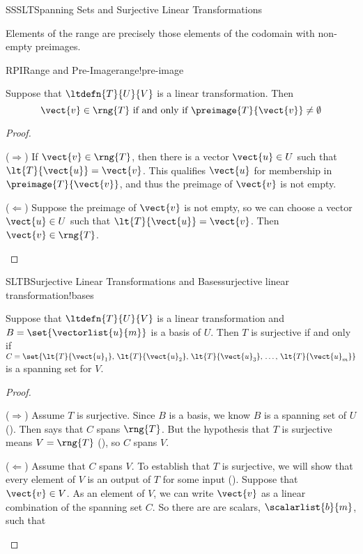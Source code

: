 \begin{subsect}{SSSLT}{Spanning Sets and Surjective Linear Transformations}
%
\begin{para}Elements of the range are precisely those elements of the codomain with non-empty preimages.\end{para}
%
\begin{theorem}{RPI}{Range and Pre-Image}{range!pre-image}
\begin{para}Suppose that $\ltdefn{T}{U}{V}$ is a linear transformation.  Then
%
\begin{equation*}
\vect{v}\in\rng{T}\text{ if and only if }\preimage{T}{\vect{v}}\neq\emptyset
\end{equation*}
\end{para}
%
\end{theorem}
%
\begin{proof}
\begin{para}($\Rightarrow$)  If $\vect{v}\in\rng{T}$, then there is a vector $\vect{u}\in U$ such that $\lt{T}{\vect{u}}=\vect{v}$.  This qualifies $\vect{u}$ for membership in $\preimage{T}{\vect{v}}$, and thus the preimage of $\vect{v}$ is not empty.\end{para}
%
\begin{para}($\Leftarrow$)  Suppose the preimage of $\vect{v}$ is not empty, so we can choose a vector $\vect{u}\in U$ such that $\lt{T}{\vect{u}}=\vect{v}$.  Then $\vect{v}\in\rng{T}$.\end{para}
%
\end{proof}
%
\begin{theorem}{SLTB}{Surjective Linear Transformations and Bases}{surjective linear transformation!bases}
\begin{para}Suppose that $\ltdefn{T}{U}{V}$ is a linear transformation and $B=\set{\vectorlist{u}{m}}$ is a basis of $U$.  Then $T$ is surjective if and only if $C=\set{\lt{T}{\vect{u}_1},\,\lt{T}{\vect{u}_2},\,\lt{T}{\vect{u}_3},\,\ldots,\,\lt{T}{\vect{u}_m}}$ is a spanning set for $V$.\end{para}
\end{theorem}
%
\begin{proof}
%
\begin{para}($\Rightarrow$)  Assume $T$ is surjective.  Since $B$ is a basis, we know $B$ is a spanning set of $U$ ().  Then  says that $C$ spans $\rng{T}$.  But the hypothesis that $T$ is surjective means $V=\rng{T}$ (), so $C$ spans $V$.\end{para}
%
\begin{para}($\Leftarrow$)  Assume that $C$ spans $V$.  To establish that $T$ is surjective, we will show that every element of $V$ is an output of $T$ for some input ().  Suppose that $\vect{v}\in V$.  As an element of $V$, we can write $\vect{v}$ as a linear combination of the spanning set $C$.  So there are are scalars, $\scalarlist{b}{m}$, such that

\end{para}
\end{proof}
\end{subsect}
